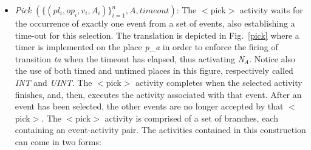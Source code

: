 \begin{itemize}
\item {\it Pick} $(\{(pl_i,op_i,v_i,A_i)\}_{i=1}^n,A,timeout)$: The $<$pick$>$ activity waits for the occurrence of exactly one event from a set of events, also establishing a
time-out for this selection. The translation is depicted in Fig.~\ref{pick} where a timer is implemented on the place {\it p\_a} in order to enforce the firing of transition {\it ta} when the timeout has elapsed, thus activating {\it N$_{A}$}. Notice also the use of both timed and untimed places in this figure, respectively called {\it INT} and {\it UINT}.  The $<$pick$>$ activity completes when the selected activity finishes, and, then, executes the activity associated with that event. After an event has been selected, the other events 
are no longer accepted by that $<$pick$>$. The $<$pick$>$ activity is comprised of a set of branches, each containing an event-activity pair.  
The activities contained in this construction can come in two forms: 


\end{itemize}
